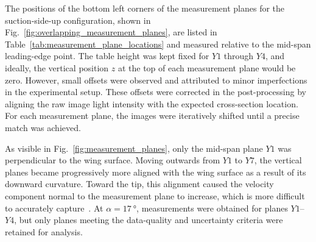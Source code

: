 \documentclass[wes, manuscript]{copernicus}
\begin{document}
The positions of the bottom left corners of the measurement planes for the suction-side-up configuration, shown in Fig.~\ref{fig:overlapping_measurement_planes}, are listed in Table~\ref{tab:measurement_plane_locations} and measured relative to the mid-span leading-edge point. The table height was kept fixed for $Y1$ through $Y4$, and ideally, the vertical position $z$ at the top of each measurement plane would be zero.  However, small offsets were observed and attributed to minor imperfections in the experimental setup. These offsets were corrected in the post-processing by aligning the raw image light intensity with the expected cross-section location. For each measurement plane, the images were iteratively shifted until a precise match was achieved.

As visible in Fig.~\ref{fig:measurement_planes}, only the mid-span plane $Y1$ was perpendicular to the wing surface. 
Moving outwards from $Y1$ to $Y7$, the vertical planes became progressively more aligned with the wing surface as a result of its downward curvature. 
Toward the tip, this alignment caused the velocity component normal to the measurement plane to increase, which is more difficult to accurately capture~\citep{PrasadAdrian1993,Prasad2000}. 
At $\alpha = 17~\unit{\degree}$, measurements were obtained for planes $Y1$--$Y4$, but only planes meeting the data-quality and uncertainty criteria were retained for analysis.
%
\end{document}
